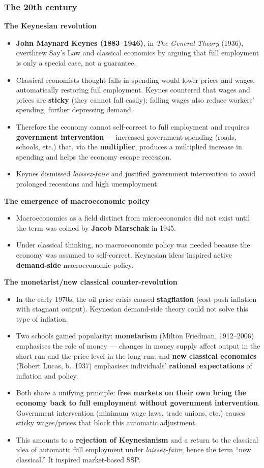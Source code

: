 \subsubsection*{The 20th century}
\textbf{The Keynesian revolution}
\begin{itemize}
  \item \textbf{John Maynard Keynes (1883--1946)}, in \textit{The General Theory} (1936), overthrew Say's Law and classical economics by arguing that full employment is only a special case, not a guarantee.
  \item Classical economists thought falls in spending would lower prices and wages, automatically restoring full employment. Keynes countered that wages and prices are \textbf{sticky} (they cannot fall easily); falling wages also reduce workers' spending, further depressing demand.
  \item Therefore the economy cannot self-correct to full employment and requires \textbf{government intervention} --- increased government spending (roads, schools, etc.) that, via the \textbf{multiplier}, produces a multiplied increase in spending and helps the economy escape recession.
  \item Keynes dismissed \textit{laissez-faire} and justified government intervention to avoid prolonged recessions and high unemployment.
\end{itemize}
\textbf{The emergence of macroeconomic policy}
\begin{itemize}
  \item Macroeconomics as a field distinct from microeconomics did not exist until the term was coined by \textbf{Jacob Marschak} in 1945.
  \item Under classical thinking, no macroeconomic policy was needed because the economy was assumed to self-correct. Keynesian ideas inspired active \textbf{demand-side} macroeconomic policy.
\end{itemize}
\textbf{The monetarist/new classical counter-revolution}
\begin{itemize}
  \item In the early 1970s, the oil price crisis caused \textbf{stagflation} (cost-push inflation with stagnant output). Keynesian demand-side theory could not solve this type of inflation.
  \item Two schools gained popularity: \textbf{monetarism} (Milton Friedman, 1912--2006) emphasises the role of money --- changes in money supply affect output in the short run and the price level in the long run; and \textbf{new classical economics} (Robert Lucas, b.\ 1937) emphasises individuals' \textbf{rational expectations} of inflation and policy.
  \item Both share a unifying principle: \textbf{free markets on their own bring the economy back to full employment without government intervention}. Government intervention (minimum wage laws, trade unions, etc.) causes sticky wages/prices that block this automatic adjustment.
  \item This amounts to a \textbf{rejection of Keynesianism} and a return to the classical idea of automatic full employment under \textit{laissez-faire}; hence the term ``new classical.'' It inspired market-based SSP.
\end{itemize}
